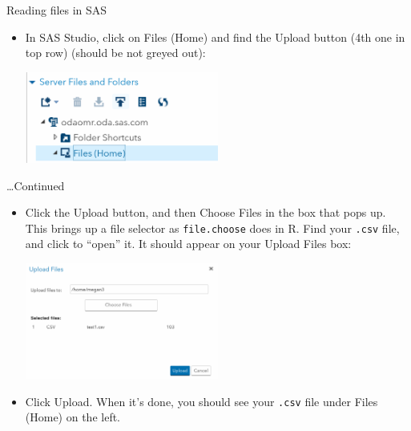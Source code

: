 \documentclass[unknownkeysallowed]{beamer}\usepackage[]{graphicx}\usepackage[]{color}
\begin{document}
\begin{frame}[fragile]{Reading files in SAS}
  
  \begin{itemize}
  \item In SAS Studio, click on Files (Home) and find the Upload
    button (4th one in top row) (should be not greyed out):
    
\includegraphics[width=0.5\textwidth]{upload}

  \end{itemize}
  
\end{frame}

\begin{frame}[fragile]{\ldots Continued}
  
  \begin{itemize}
\item Click the Upload button, and then Choose Files in the box that
  pops up. This brings up a file selector as \texttt{file.choose} does
  in R. Find your \texttt{.csv} file, and click to ``open'' it. It
  should appear on your Upload Files box:
  
\includegraphics[width=0.5\textwidth]{upload-file}

\item Click Upload. When it's done, you should see your \texttt{.csv}
  file under Files (Home) on the left.
  \end{itemize}
  
\end{frame}
\end{document}
